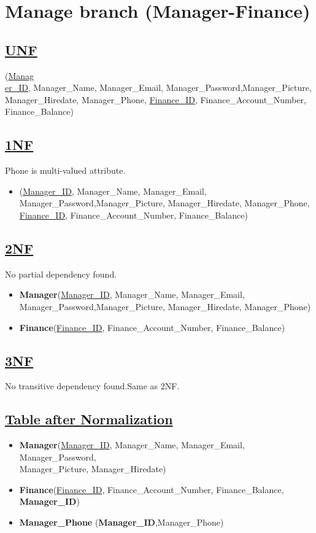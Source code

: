 \section{\texorpdfstring{\centering Manage branch (Manager-Finance)}{Manage branch (Manager-Finance)}}

\subsection*{\underline{UNF}}

(\underline{Manag\\er\_ID}, Manager\_Name, Manager\_Email, Manager\_Password,Manager\_Picture, Manager\_Hiredate, Manager\_Phone,
\underline{Finance\_ID}, Finance\_Account\_Number, Finance\_Balance)

\subsection*{\underline{1NF}}
Phone is multi-valued attribute.
\vskip 0.2in

\begin{itemize}
    \item
          (\underline{Manager\_ID}, Manager\_Name, Manager\_Email, Manager\_Password,Manager\_Picture, Manager\_Hiredate, Manager\_Phone,
          \underline{Finance\_ID}, Finance\_Account\_Number, Finance\_Balance)
\end{itemize}

\subsection*{\underline{2NF}}
No partial dependency found.
\begin{itemize}
    \item \textbf{Manager}(\underline{Manager\_ID}, Manager\_Name, Manager\_Email, Manager\_Password,Manager\_Picture, Manager\_Hiredate, Manager\_Phone)
    \item \textbf{Finance}(\underline{Finance\_ID}, Finance\_Account\_Number, Finance\_Balance)
\end{itemize}

\subsection*{\underline{3NF}}
No transitive dependency found.Same as 2NF.

\subsection*{\underline{Table after Normalization}}
\begin{itemize}
    \item \textbf{Manager}(\underline{Manager\_ID}, Manager\_Name, Manager\_Email, Manager\_Password,\\Manager\_Picture, Manager\_Hiredate)
    \item \textbf{Finance}(\underline{Finance\_ID}, Finance\_Account\_Number, Finance\_Balance,\textbf{ Manager\_ID})
    \item \textbf{Manager\_Phone} (\textbf{Manager\_ID},{Manager\_Phone})
\end{itemize}
\clearpage